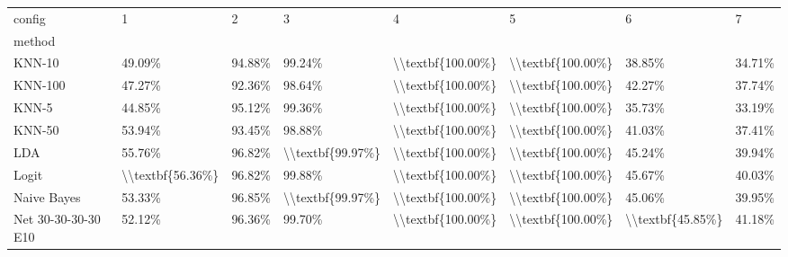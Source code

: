 \begin{tabular}{llllllll}
\toprule
config &                 1 &                 2 &                 3 &                  4 &                  5 &                 6 &                 7 \\
method              &                   &                   &                   &                    &                    &                   &                   \\
\midrule
KNN-10              &            49.09\% &            94.88\% &            99.24\% &  \textbackslash \textbackslash textbf\{100.00\%\} &  \textbackslash \textbackslash textbf\{100.00\%\} &            38.85\% &            34.71\% \\
KNN-100             &            47.27\% &            92.36\% &            98.64\% &  \textbackslash \textbackslash textbf\{100.00\%\} &  \textbackslash \textbackslash textbf\{100.00\%\} &            42.27\% &            37.74\% \\
KNN-5               &            44.85\% &            95.12\% &            99.36\% &  \textbackslash \textbackslash textbf\{100.00\%\} &  \textbackslash \textbackslash textbf\{100.00\%\} &            35.73\% &            33.19\% \\
KNN-50              &            53.94\% &            93.45\% &            98.88\% &  \textbackslash \textbackslash textbf\{100.00\%\} &  \textbackslash \textbackslash textbf\{100.00\%\} &            41.03\% &            37.41\% \\
LDA                 &            55.76\% &            96.82\% &  \textbackslash \textbackslash textbf\{99.97\%\} &  \textbackslash \textbackslash textbf\{100.00\%\} &  \textbackslash \textbackslash textbf\{100.00\%\} &            45.24\% &            39.94\% \\
Logit               &  \textbackslash \textbackslash textbf\{56.36\%\} &            96.82\% &            99.88\% &  \textbackslash \textbackslash textbf\{100.00\%\} &  \textbackslash \textbackslash textbf\{100.00\%\} &            45.67\% &            40.03\% \\
Naive Bayes         &            53.33\% &            96.85\% &  \textbackslash \textbackslash textbf\{99.97\%\} &  \textbackslash \textbackslash textbf\{100.00\%\} &  \textbackslash \textbackslash textbf\{100.00\%\} &            45.06\% &            39.95\% \\
Net 30-30-30-30 E10 &            52.12\% &            96.36\% &            99.70\% &  \textbackslash \textbackslash textbf\{100.00\%\} &  \textbackslash \textbackslash textbf\{100.00\%\} &  \textbackslash \textbackslash textbf\{45.85\%\} &            41.18\% \\

\end{tabular}
